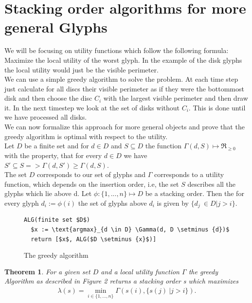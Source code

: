 \documentclass[a4paper,11pt]{article}
\newtheorem{theorem}{Theorem}
\begin{document}
\section{Stacking order algorithms for more general Glyphs}

We will be focusing on utility functions which follow the following formula: Maximize the local utility of the worst glyph. In the example of the disk glyphs the local utility would just be the visible perimeter. \\We can use a simple greedy algorithm to solve the problem. At each time step just calculate for all discs their visible perimeter as if they were the bottommost disk and then choose the disc $C_i$ with the largest visible perimeter and then draw it. In the next timestep we look at the set of disks without $C_i$. This is done until we have processed all disks.\\

We can now formalize this approach for more general objects and prove that the greedy algorithm is optimal with respect to the utility.
\\

Let $D$ be a finite set and for $d \in D$ and $S \subseteq D$ the function $ \Gamma(d, S) \mapsto \Re_{\geq 0} $ with the property, that for every $d \in D$ we have $S' \subseteq S => \Gamma(d, S') \geq \Gamma(d, S)$. \\
The set $D$ corresponds to our set of glyphs and $\Gamma$ corresponds to a utility function, which depends on the insertion order, i.e, the set $S$ describes all the glyphs which lie above d. Let $\phi: \{1,...,n\} \mapsto D$ be a stacking order. Then the for every glyph $d_i:=\phi(i)$ the set of glyphs above $d_i$ is given by $\{d_j\ \in D | j > i\}$.

\begin{figure}[H]
  \begin{lstlisting}[mathescape=true]
ALG(finite set $D$)
  $x := \text{argmax}_{d \in D} \Gamma(d, D \setminus {d})$
  return [$x$, ALG($D \setminus {x}$)]
  \end{lstlisting}
  \caption{The greedy algorithm}
\end{figure}

\begin{theorem}
  For a given set $D$ and a local utility function $\Gamma$ the greedy Algorithm as described in Figure 2 returns a stacking order s which maximizes\begin{align*}
    \lambda(s) = \min_{i \in \{1,\dots,n\}} \Gamma(s(i), \{s(j)\ | j > i\}).
  \end{align*}
\end{theorem}
\end{document}
